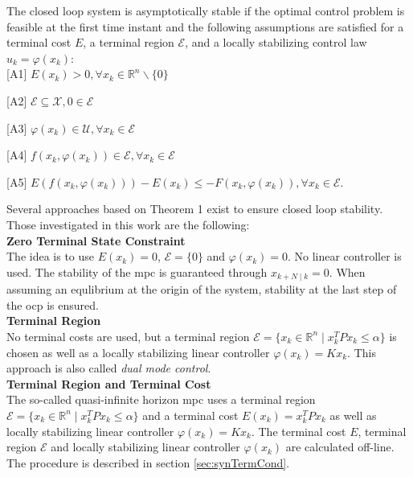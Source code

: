 \documentclass[10pt,a4paper,titlepage]{article}
\begin{document}
\begin{tcolorbox}[colback=gray!20, colframe=gray!80,title=Theorem 1,arc=0.0mm]
The closed loop system is asymptotically stable if the optimal control problem is feasible at the first time instant and
the following assumptions are satisfied for a terminal cost $E$, a terminal region $\mathcal{E}$, and a locally stabilizing
control law $u_{k}=\varphi\left(x_{k}\right)$:\\

[A1] $E\left(x_{k}\right)>0, \forall x_{k} \in \mathbb{R}^{n} \backslash\{0\}$

[A2]  $\mathcal{E} \subseteq \mathcal{X}, 0 \in \mathcal{E}$

[A3] $\varphi\left(x_{k}\right) \in \mathcal{U}, \forall x_{k} \in \mathcal{E}$

[A4] $f\left(x_{k}, \varphi\left(x_{k}\right)\right) \in \mathcal{E}, \forall x_{k} \in \mathcal{E}$

[A5] $E\left(f\left(x_{k}, \varphi\left(x_{k}\right)\right)\right)-E\left(x_{k}\right) \leq-F\left(x_{k}, \varphi\left(x_{k}\right)\right), \forall x_{k} \in \mathcal{E}$.
\end{tcolorbox}

Several approaches based on Theorem 1 exist to ensure closed loop stability. Those investigated in this work are the following:\\

\textbf{Zero Terminal State Constraint}\\
The idea is to use $E(x_k) = 0$, $\mathcal{E} = \{ 0 \}$ and $\varphi(x_{k}) = 0$. No linear controller is used.
The stability of the \gls{mpc} is guaranteed through $x_{k+N \mid k} = 0$. When assuming an equlibrium at the
origin of the system, stability at the last step of the \gls{ocp} is ensured.\\

\textbf{Terminal Region}\\
No terminal costs are used, but a terminal region $\mathcal{E} = \{x_k \in \mathbb{R}^n \mid x_k^TPx_k \leq \alpha \}$
is chosen as well as a locally stabilizing linear controller $\varphi(x_{k}) = K x_k$. This approach is also called
\textit{dual mode control}.\\

\textbf{Terminal Region and Terminal Cost}\\
The so-called quasi-infinite horizon \gls{mpc} uses a terminal region $\mathcal{E} = \{x_k \in \mathbb{R}^n \mid x_k^TPx_k \leq \alpha \}$
and a terminal cost $E(x_k) = x_k^T P x_k$ as well as locally stabilizing linear controller $\varphi(x_{k}) = K x_k$.
The terminal cost $E$, terminal region $\mathcal{E}$ and locally stabilizing linear controller $\varphi(x_{k})$ are 
calculated off-line. The procedure is described in section \ref{sec:synTermCond}.
\end{document}
